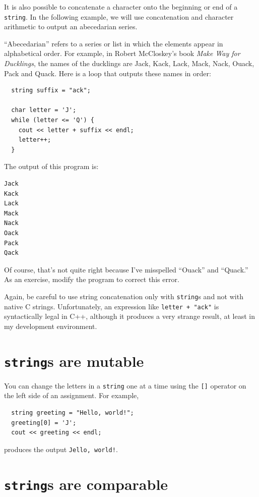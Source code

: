 It is also possible to concatenate a character onto the
beginning or end of a {\tt string}.  In the following example, we
will use concatenation and character arithmetic to output
an abecedarian series.

``Abecedarian'' refers to a series or list in which the elements
appear in alphabetical order.  For example, in Robert McCloskey's book
{\em Make Way for Ducklings}, the names of the ducklings are Jack,
Kack, Lack, Mack, Nack, Ouack, Pack and Quack.  Here is a loop that
outputs these names in order:

\begin{verbatim}
  string suffix = "ack";

  char letter = 'J';
  while (letter <= 'Q') {
    cout << letter + suffix << endl;
    letter++;
  }
\end{verbatim}
%
The output of this program is:

\begin{verbatim}
Jack
Kack
Lack
Mack
Nack
Oack
Pack
Qack
\end{verbatim}
%
Of course, that's not quite right because I've misspelled ``Ouack''
and ``Quack.''  As an exercise, modify the program to correct
this error.

Again, be careful to use string concatenation only with {\tt string}s
and not with native C strings.  Unfortunately, an expression like
{\tt letter + "ack"} is syntactically legal in C++, although it
produces a very strange result, at least in my development environment.

\section{{\tt string}s are mutable}

You can change the letters in a {\tt string} one at a time
using the {\tt []} operator on the left side of an assignment.
For example,

\begin{verbatim}
  string greeting = "Hello, world!";
  greeting[0] = 'J';
  cout << greeting << endl;
\end{verbatim}
%
produces the output {\tt Jello, world!}.


\section{{\tt string}s are comparable}
\label{incomparable}


